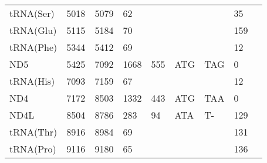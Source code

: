 \documentclass[../DISSERTACAO_MAIN.tex]{subfiles}
\begin{document}
\begin{longtable}{llllllllllllllllllllll}
			tRNA(Ser)    & \multicolumn{2}{l}{5018}    & \multicolumn{2}{l}{5079}    & \multicolumn{2}{l}{62}          & \multicolumn{3}{l}{}                          & \multicolumn{3}{l}{}      & \multicolumn{3}{l}{}        & \multicolumn{3}{l}{35}          & \multicolumn{3}{l}{}         \\
			tRNA(Glu)    & \multicolumn{2}{l}{5115}    & \multicolumn{2}{l}{5184}    & \multicolumn{2}{l}{70}          & \multicolumn{3}{l}{}                          & \multicolumn{3}{l}{}      & \multicolumn{3}{l}{}        & \multicolumn{3}{l}{159}         & \multicolumn{3}{l}{}         \\
			tRNA(Phe)    & \multicolumn{2}{l}{5344}    & \multicolumn{2}{l}{5412}    & \multicolumn{2}{l}{69}          & \multicolumn{3}{l}{}                          & \multicolumn{3}{l}{}      & \multicolumn{3}{l}{}        & \multicolumn{3}{l}{12}          & \multicolumn{3}{l}{}         \\
			ND5          & \multicolumn{2}{l}{5425}    & \multicolumn{2}{l}{7092}    & \multicolumn{2}{l}{1668}        & \multicolumn{3}{l}{555}                       & \multicolumn{3}{l}{ATG}   & \multicolumn{3}{l}{TAG}     & \multicolumn{3}{l}{0}           & \multicolumn{3}{l}{}         \\
			tRNA(His)    & \multicolumn{2}{l}{7093}    & \multicolumn{2}{l}{7159}    & \multicolumn{2}{l}{67}          & \multicolumn{3}{l}{}                          & \multicolumn{3}{l}{}      & \multicolumn{3}{l}{}        & \multicolumn{3}{l}{12}          & \multicolumn{3}{l}{}         \\
			ND4          & \multicolumn{2}{l}{7172}    & \multicolumn{2}{l}{8503}    & \multicolumn{2}{l}{1332}        & \multicolumn{3}{l}{443}                       & \multicolumn{3}{l}{ATG}   & \multicolumn{3}{l}{TAA}     & \multicolumn{3}{l}{0}           & \multicolumn{3}{l}{}         \\
			ND4L         & \multicolumn{2}{l}{8504}    & \multicolumn{2}{l}{8786}    & \multicolumn{2}{l}{283}         & \multicolumn{3}{l}{94}                        & \multicolumn{3}{l}{ATA}   & \multicolumn{3}{l}{T-}      & \multicolumn{3}{l}{129}         & \multicolumn{3}{l}{}         \\
			tRNA(Thr)    & \multicolumn{2}{l}{8916}    & \multicolumn{2}{l}{8984}    & \multicolumn{2}{l}{69}          & \multicolumn{3}{l}{}                          & \multicolumn{3}{l}{}      & \multicolumn{3}{l}{}        & \multicolumn{3}{l}{131}         & \multicolumn{3}{l}{}         \\
			tRNA(Pro)    & \multicolumn{2}{l}{9116}    & \multicolumn{2}{l}{9180}    & \multicolumn{2}{l}{65}          & \multicolumn{3}{l}{}                          & \multicolumn{3}{l}{}      & \multicolumn{3}{l}{}        & \multicolumn{3}{l}{136}         & \multicolumn{3}{l}{}         \\

\end{longtable}
\end{document}
